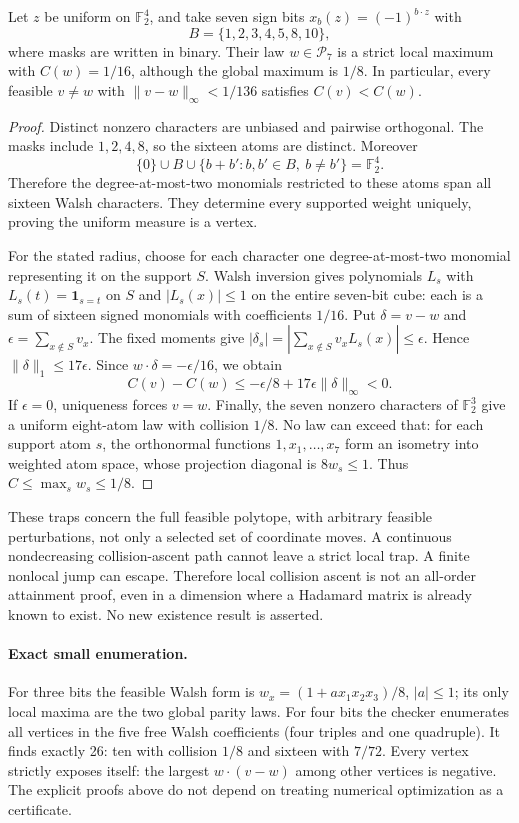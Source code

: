 \begin{theorem}
\label{s13:thm:attainment-admissible-trap}
Let $z$ be uniform on $\mathbb F_2^4$, and take seven sign bits
$x_b(z)=(-1)^{b\cdot z}$ with
\[
 B=\{1,2,3,4,5,8,10\},
\]
where masks are written in binary. Their law $w\in\mathcal P_7$ is
a strict local maximum with $C(w)=1/16$, although the global maximum
is $1/8$. In particular, every feasible $v\ne w$ with
$\|v-w\|_\infty<1/136$ satisfies $C(v)<C(w)$.
\end{theorem}
\begin{proof}
Distinct nonzero characters are unbiased and pairwise orthogonal.
The masks include $1,2,4,8$, so the sixteen atoms are distinct.
Moreover
\[
 \{0\}\cup B\cup\{b+b':b,b'\in B,\ b\ne b'\}
 =\mathbb F_2^4.
\]
Therefore the degree-at-most-two monomials restricted to these atoms
span all sixteen Walsh characters. They determine every supported
weight uniquely, proving the uniform measure is a vertex.

For the stated radius, choose for each character one degree-at-most-two
monomial representing it on the support $S$. Walsh inversion gives
polynomials $L_s$ with $L_s(t)=\mathbf1_{s=t}$ on $S$ and
$|L_s(x)|\le1$ on the entire seven-bit cube: each is a sum of sixteen
signed monomials with coefficients $1/16$.
Put $\delta=v-w$ and $\epsilon=\sum_{x\notin S}v_x$.
The fixed moments give
$|\delta_s|=|\sum_{x\notin S}v_xL_s(x)|\le\epsilon$.
Hence $\|\delta\|_1\le17\epsilon$. Since
$w\cdot\delta=-\epsilon/16$, we obtain
\[
 C(v)-C(w)\le-\epsilon/8+
             17\epsilon\|\delta\|_\infty<0.
\]
If $\epsilon=0$, uniqueness forces $v=w$.
Finally, the seven nonzero characters of $\mathbb F_2^3$ give a
uniform eight-atom law with collision $1/8$. No law can exceed that:
for each support atom $s$, the orthonormal functions $1,x_1,\ldots,x_7$
form an isometry into weighted atom space, whose projection diagonal
is $8w_s\le1$. Thus $C\le\max_s w_s\le1/8$.
\end{proof}
These traps concern the full feasible polytope, with arbitrary feasible
perturbations, not only a selected set of coordinate moves. A continuous
nondecreasing collision-ascent path cannot leave a strict local trap.
A finite nonlocal jump can escape. Therefore local collision ascent is
not an all-order attainment proof, even in a dimension where a Hadamard
matrix is already known to exist. No new existence result is asserted.

\paragraph{Exact small enumeration.}
For three bits the feasible Walsh form is
$w_x=(1+a x_1x_2x_3)/8$, $|a|\le1$; its only local maxima are the two
global parity laws. For four bits the checker enumerates all vertices
in the five free Walsh coefficients (four triples and one quadruple).
It finds exactly 26: ten with collision $1/8$ and sixteen with $7/72$.
Every vertex strictly exposes itself: the largest $w\cdot(v-w)$ among
other vertices is negative. The explicit proofs above do not depend
on treating numerical optimization as a certificate.

